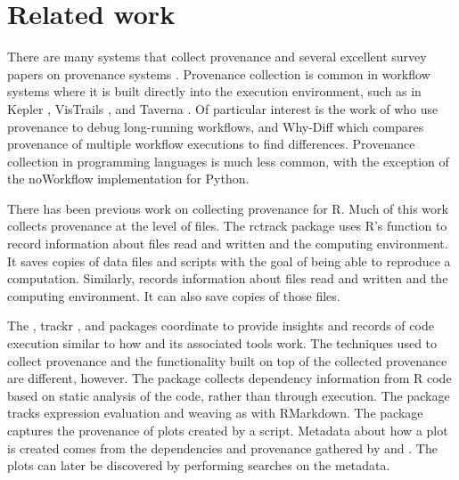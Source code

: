 \section{Related work}
There are many systems that collect provenance and several excellent survey papers on provenance systems \citep{Freire:2008yq,Herschel:VLDB18,Pimentel:2019aa}.
Provenance collection is common in workflow systems where it is built directly into the execution environment, such as in Kepler \citep{Altintas:IPAW06}, VisTrails \citep{DKoop:2013fk}, and Taverna \citep{Missier:2008vn}.  Of particular interest is the work of \citet{Oliveira:2014aa} who use provenance to debug long-running workflows, and Why-Diff \citep{Thavasimani:2019aa} which compares provenance of multiple workflow executions to find differences.  Provenance collection in programming languages is much less common, with the exception of the noWorkflow \citep{Leonardo:IPAW14} implementation for Python.  

There has been previous work on collecting provenance for R.  Much of this work collects provenance at the level of files.  The rctrack package \citep{Liu:Bioinf14} uses R's  function to record information about files read and written and the computing environment.  It saves copies of data files and scripts with the goal of being able to reproduce a computation.
Similarly,  \citep{recordr} records information about files read and written and the computing environment.  It can also save copies of those files.

The  \citep{codedepends}, trackr \citep{trackr}, and  \citep{trackr} packages coordinate to provide insights and records of code execution similar to how  and its associated tools work.  The techniques used to collect provenance and the functionality built on top of the collected provenance are different, however.
The  package  collects dependency information from R code based on static analysis of the code, rather than through execution.
The  package tracks expression evaluation and weaving as with RMarkdown.
The  package \citep{trackr} captures the provenance of plots created by a script.  Metadata about how a plot is created comes from the dependencies and provenance gathered by  and .  The plots can later be discovered by performing searches on the metadata.  

